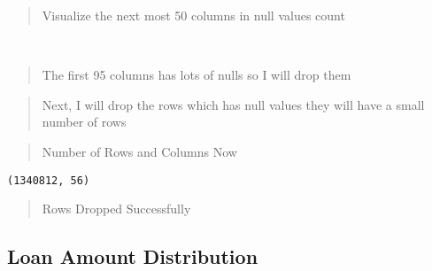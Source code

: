 \documentclass[11pt]{article}
\begin{document}
    \begin{quote}
Visualize the next most 50 columns in null values count
\end{quote}

    \begin{center}
    \end{center}
    { \hspace*{\fill} \\}
    
    \begin{quote}
The first 95 columns has lots of nulls so I will drop them
\end{quote}

    \begin{quote}
Next, I will drop the rows which has null values they will have a small
number of rows
\end{quote}

    \begin{quote}
Number of Rows and Columns Now
\end{quote}

    \begin{Verbatim}[commandchars=\\\{\}]
(1340812, 56)
    \end{Verbatim}

    \begin{quote}
Rows Dropped Successfully
\end{quote}

    \hypertarget{loan-amount-distribution}{%
\subsection{Loan Amount Distribution}\label{loan-amount-distribution}}

    \begin{center}
    \end{center}
    { \hspace*{\fill} \\}
    
    \begin{center}
    \end{center}
    { \hspace*{\fill} \\}
    
\end{document}

